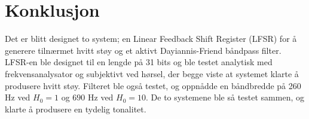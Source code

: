 \section{Konklusjon}
\label{konklusjon}
Det er blitt designet to system; en Linear Feedback Shift Register (LFSR) for å generere tilnærmet hvitt støy og 
et aktivt Dayiannis-Friend båndpass filter. LFSR-en ble designet til en lengde på 31 bits og ble testet 
analytisk med frekvensanalysator og subjektivt ved hørsel, der begge viste at systemet klarte å produsere 
hvitt støy. Filteret ble også testet, og oppnådde en båndbredde på 260 Hz ved $H_0 = 1$ og $690$ Hz ved $H_0 = 10$.
De to systemene ble så testet sammen, og klarte å produsere en tydelig tonalitet.
